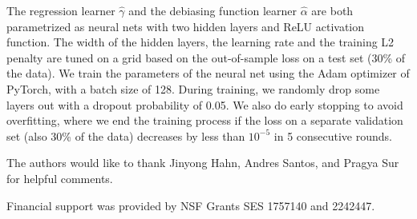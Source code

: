 \documentclass[aos]{imsart}
\numberwithin{equation}{section}
\theoremstyle{plain}
\theoremstyle{remark}
\begin{document}
\begin{appendix}
The regression learner $\hat{\gamma}$ and the debiasing function learner $\hat{\alpha}$ are both parametrized as neural nets with two hidden layers and ReLU activation function. The width of the hidden layers, the learning rate and the training L2 penalty are tuned on a grid based on the out-of-sample loss on a test set (30\% of the data). We train the parameters of the neural net using the Adam optimizer of PyTorch, with a batch size of 128. During training, we randomly drop some layers out with a dropout probability of 0.05. We also do early stopping to avoid overfitting, where we end the training process if the loss on a separate validation set (also 30\% of the data) decreases by less than $10^{-5}$ in 5 consecutive rounds.
\end{appendix}

\begin{acks}[Acknowledgments]
The authors would like to thank Jinyong Hahn, Andres Santos, and Pragya Sur for helpful comments.
\end{acks}

\begin{funding}
Financial support was provided by NSF Grants SES 1757140 and 2242447.
\end{funding}

\end{document}
